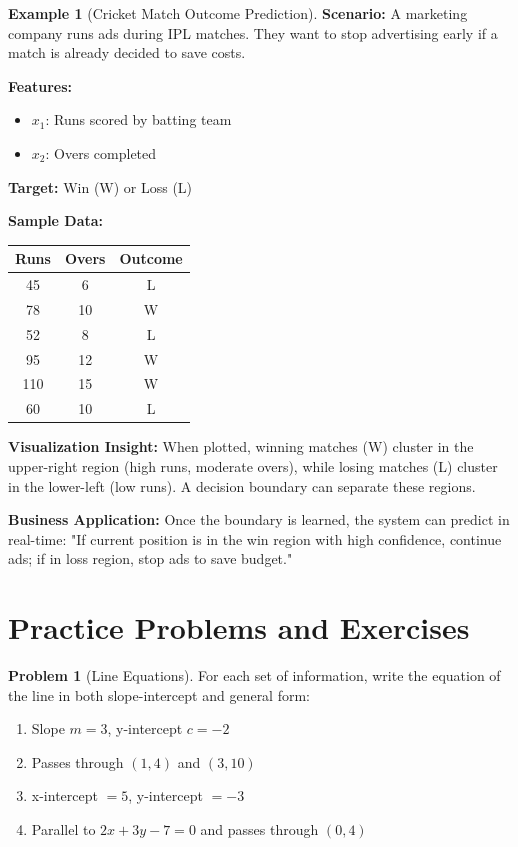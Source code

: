 \documentclass[12pt,a4paper]{article}
\theoremstyle{directpoint}
\theoremstyle{definition}
\newtheorem{example}{Example}[section]
\newtheorem{problem}{Problem}[section]
\begin{document}
\begin{example}[Cricket Match Outcome Prediction]
\textbf{Scenario:} A marketing company runs ads during IPL matches. They want to stop advertising early if a match is already decided to save costs.

\textbf{Features:}
\begin{itemize}
    \item $x_1$: Runs scored by batting team
    \item $x_2$: Overs completed
\end{itemize}

\textbf{Target:} Win (W) or Loss (L)

\textbf{Sample Data:}

\begin{center}
\begin{tabular}{|c|c|c|}
\hline
\textbf{Runs} & \textbf{Overs} & \textbf{Outcome} \\
\hline
45 & 6 & L \\
78 & 10 & W \\
52 & 8 & L \\
95 & 12 & W \\
110 & 15 & W \\
60 & 10 & L \\
\hline
\end{tabular}
\end{center}

\textbf{Visualization Insight:} When plotted, winning matches (W) cluster in the upper-right region (high runs, moderate overs), while losing matches (L) cluster in the lower-left (low runs). A decision boundary can separate these regions.

\textbf{Business Application:} Once the boundary is learned, the system can predict in real-time: "If current position is in the win region with high confidence, continue ads; if in loss region, stop ads to save budget."
\end{example}

\newpage

\section{Practice Problems and Exercises}

\begin{problem}[Line Equations]
For each set of information, write the equation of the line in both slope-intercept and general form:
\begin{enumerate}[label=(\alph*)]
    \item Slope $m = 3$, y-intercept $c = -2$
    \item Passes through $(1, 4)$ and $(3, 10)$
    \item x-intercept $= 5$, y-intercept $= -3$
    \item Parallel to $2x + 3y - 7 = 0$ and passes through $(0, 4)$
\end{enumerate}
\end{problem}
\end{document}
